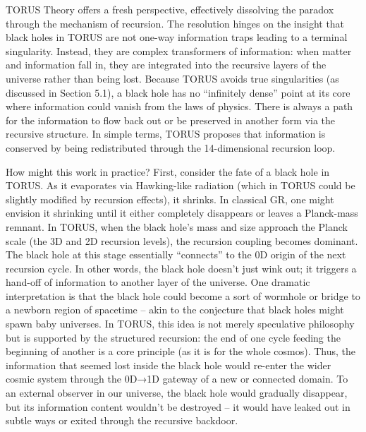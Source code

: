 \documentclass[
]{article}
\begin{document}
TORUS Theory offers a fresh perspective, effectively dissolving the
paradox through the mechanism of recursion. The resolution hinges on the
insight that black holes in TORUS are not one-way information traps
leading to a terminal singularity. Instead, they are complex
transformers of information: when matter and information fall in, they
are integrated into the recursive layers of the universe rather than
being lost. Because TORUS avoids true singularities (as discussed in
Section 5.1), a black hole has no ``infinitely dense'' point at its core
where information could vanish from the laws of physics. There is always
a path for the information to flow back out or be preserved in another
form via the recursive structure. In simple terms, TORUS proposes that
information is conserved by being redistributed through the
14-dimensional recursion loop.

How might this work in practice? First, consider the fate of a black
hole in TORUS. As it evaporates via Hawking-like radiation (which in
TORUS could be slightly modified by recursion effects), it shrinks. In
classical GR, one might envision it shrinking until it either completely
disappears or leaves a Planck-mass remnant. In TORUS, when the black
hole's mass and size approach the Planck scale (the 3D and 2D recursion
levels), the recursion coupling becomes dominant. The black hole at this
stage essentially ``connects'' to the 0D origin of the next recursion
cycle. In other words, the black hole doesn't just wink out; it triggers
a hand-off of information to another layer of the universe. One dramatic
interpretation is that the black hole could become a sort of wormhole or
bridge to a newborn region of spacetime -- akin to the conjecture that
black holes might spawn baby universes. In TORUS, this idea is not
merely speculative philosophy but is supported by the structured
recursion: the end of one cycle feeding the beginning of another is a
core principle (as it is for the whole cosmos). Thus, the information
that seemed lost inside the black hole would re-enter the wider cosmic
system through the 0D→1D gateway of a new or connected domain. To an
external observer in our universe, the black hole would gradually
disappear, but its information content wouldn't be destroyed -- it would
have leaked out in subtle ways or exited through the recursive backdoor.
\end{document}
